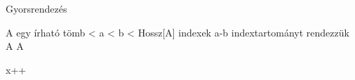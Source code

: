 \documentclass{article}
\theoremstyle{plain}
\theoremstyle{definition}
\theoremstyle{remark}
\begin{document}
\begin{algorithm}\caption{Gyorsrendezés}
\begin{algorithmic}[2]
\Require A egy írható tömb
 < a < b < Hossz[A] indexek
\Ensure a-b indextartományt rendezzük
\State\Return A
\Else
\State{}
\State{}
\State{}
\State\Return A

\EndIf
\EndProcedure
\end{algorithmic}
\end{algorithm}


\begin{algorithmic}[2]
\dwdo
\State x++
\end{algorithmic}
\end{document}
